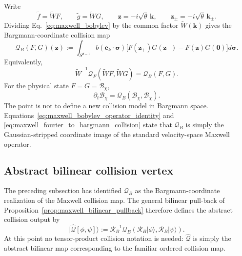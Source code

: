 \documentclass[11pt,oneside]{article}
\numberwithin{equation}{section}
\theoremstyle{definition}
\begin{document}
Write
\begin{equation}
\widetilde f=\widetilde W F,
\qquad
\widetilde g=\widetilde W G,
\qquad
\bm z=-i\sqrt\theta\,\bm k,
\qquad
\bm z_\pm=-i\sqrt\theta\,\bm k_\pm.
\end{equation}
Dividing Eq.~\eqref{eq:maxwell_bobylev} by the common factor $\widetilde W(\bm k)$ gives the Bargmann-coordinate collision map
\begin{equation}
\mathcal Q_B(F,G)(\bm z)
:=
\int_{S^{d-1}}
 b(\bm e_k\!\cdot\!\bm\sigma)
 \Big[
 F(\bm z_+)G(\bm z_-)-F(\bm z)G(\bm0)
 \Big]d\bm\sigma .
\label{eq:maxwell_QB_bilinear_def}
\end{equation}
Equivalently,
\begin{equation}
\widetilde W^{-1}\mathcal Q_F(\widetilde W F,\widetilde W G)
=\mathcal Q_B(F,G).
\label{eq:maxwell_fourier_to_bargmann_collision}
\end{equation}
For the physical state $F=G=\mathscr B_\chi$,
\begin{equation}
\partial_t\mathscr B_\chi
=\mathcal Q_B(\mathscr B_\chi,\mathscr B_\chi).
\label{eq:maxwell_bobylev_bargmann}
\end{equation}
The point is not to define a new collision model in Bargmann space.  Equations~\eqref{eq:maxwell_bobylev_operator_identity} and \eqref{eq:maxwell_fourier_to_bargmann_collision} state that $\mathcal Q_B$ is simply the Gaussian-stripped coordinate image of the standard velocity-space Maxwell operator.

\subsection{Abstract bilinear collision vertex}
\label{subsec:maxwell_abstract_vertex}

The preceding subsection has identified $\mathcal Q_B$ as the Bargmann-coordinate realization of the Maxwell collision map.  The general bilinear pull-back of Proposition~\ref{prop:maxwell_bilinear_pullback} therefore defines the abstract collision output by
\begin{equation}
|\widehat{\mathcal Q}[\phi,\psi]\rangle
:=
\mathcal R_B^{-1}\mathcal Q_B(\mathcal R_B|\phi\rangle,\mathcal R_B|\psi\rangle).
\label{eq:maxwell_abstract_Q}
\end{equation}
At this point no tensor-product collision notation is needed: $\widehat{\mathcal Q}$ is simply the abstract bilinear map corresponding to the familiar ordered collision map.
\end{document}

